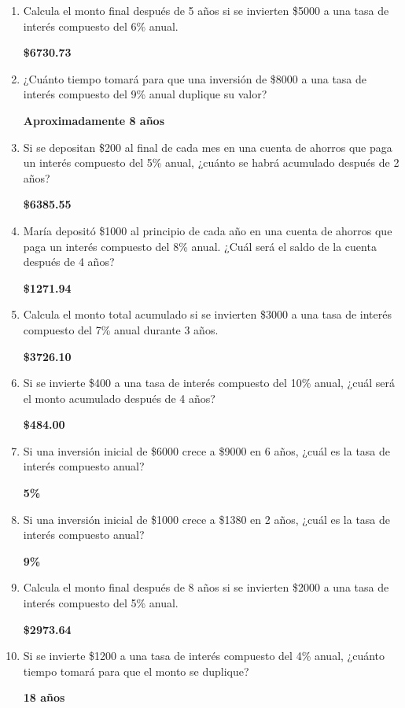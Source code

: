 \documentclass{article}
\begin{document}
\begin{enumerate}
    \item Calcula el monto final después de 5 años si se invierten \$5000 a una tasa de interés compuesto del 6\% anual.
    
    \textbf{\$6730.73}
    
    \item ¿Cuánto tiempo tomará para que una inversión de \$8000 a una tasa de interés compuesto del 9\% anual duplique su valor?
    
    \textbf{Aproximadamente 8 años}
    
    \item Si se depositan \$200 al final de cada mes en una cuenta de ahorros que paga un interés compuesto del 5\% anual, ¿cuánto se habrá acumulado después de 2 años?
    
    \textbf{\$6385.55}
    
    \item María depositó \$1000 al principio de cada año en una cuenta de ahorros que paga un interés compuesto del 8\% anual. ¿Cuál será el saldo de la cuenta después de 4 años?
    
    \textbf{\$1271.94}
    
    \item Calcula el monto total acumulado si se invierten \$3000 a una tasa de interés compuesto del 7\% anual durante 3 años.
    
    \textbf{\$3726.10}
    
    \item Si se invierte \$400 a una tasa de interés compuesto del 10\% anual, ¿cuál será el monto acumulado después de 4 años?
    
    \textbf{\$484.00}
    
    \item Si una inversión inicial de \$6000 crece a \$9000 en 6 años, ¿cuál es la tasa de interés compuesto anual?
    
    \textbf{5\%}
    
    \item Si una inversión inicial de \$1000 crece a \$1380 en 2 años, ¿cuál es la tasa de interés compuesto anual?
    
    \textbf{9\%}
    
    \item Calcula el monto final después de 8 años si se invierten \$2000 a una tasa de interés compuesto del 5\% anual.
    
    \textbf{\$2973.64}
    
    \item Si se invierte \$1200 a una tasa de interés compuesto del 4\% anual, ¿cuánto tiempo tomará para que el monto se duplique?
    
    \textbf{18 años}
\end{enumerate}
\end{document}
